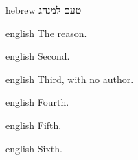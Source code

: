 \documentclass{article}
\begin{document}
\begin{mekor}
\begin{mekorlang}{hebrew}
טעם למנהג
\end{mekorlang}
\begin{mekorlang}{english}
The reason.
\end{mekorlang}
\end{mekor}
\begin{mekor}
\begin{mekorlang}{english}
Second.
\end{mekorlang}
\end{mekor}
\begin{mekor}
\begin{mekorlang}{english}
Third, with no author.
\end{mekorlang}
\end{mekor}
\begin{mekor}
\begin{mekorlang}{english}{}
Fourth.
\end{mekorlang}
\end{mekor}
\begin{mekor}
\begin{mekorlang}{english}{}
Fifth.
\end{mekorlang}
\end{mekor}
\begin{mekor}
\begin{mekorlang}{english}{}
Sixth.
\end{mekorlang}
\end{mekor}
\end{document}
